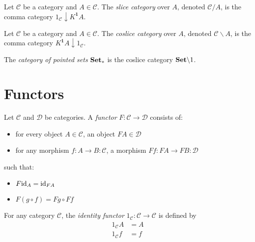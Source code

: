 \begin{df}
    Let $\mathcal{C}$ be a category and $A \in \mathcal{C}$. The \emph{slice category} over $A$, denoted $\mathcal{C} / A$, is the comma category $1_\mathcal{C} \downarrow K^{\mathbf{1}} A$.
\end{df}

\begin{df}
    Let $\mathcal{C}$ be a category and $A \in \mathcal{C}$. The \emph{coslice category} over $A$, denoted $\mathcal{C} \backslash A$, is the comma category $K^{\mathbf{1}} A \downarrow 1_\mathcal{C}$.
\end{df}

\begin{df}
    The \emph{category of pointed sets} $\mathbf{Set}_*$ is the coslice category $\mathbf{Set} \backslash 1$.
\end{df}

\chapter{Functors}

\begin{df}[Functor]
    Let $\mathcal{C}$ and $\mathcal{D}$ be categories. A \emph{functor} $F : \mathcal{C} \rightarrow \mathcal{D}$ consists of:
    \begin{itemize}
        \item for every object $A \in \mathcal{C}$, an object $FA \in \mathcal{D}$
        \item for any morphism $f : A \rightarrow B : \mathcal{C}$, a morphism $Ff : FA
                  \rightarrow FB : \mathcal{D}$
    \end{itemize}
    such that:
    \begin{itemize}
        \item $F \mathrm{id}_{A} = \mathrm{id}_{FA}$
        \item $F(g \circ f) = Fg \circ Ff$
    \end{itemize}
\end{df}

\begin{df}
    For any category $\mathcal{C}$, the \emph{identity functor} $1_\mathcal{C} : \mathcal{C} \rightarrow \mathcal{C}$ is defined by
    \begin{align*}
        1_\mathcal{C} A & = A \\
        1_\mathcal{C} f & = f
    \end{align*}
\end{df}

